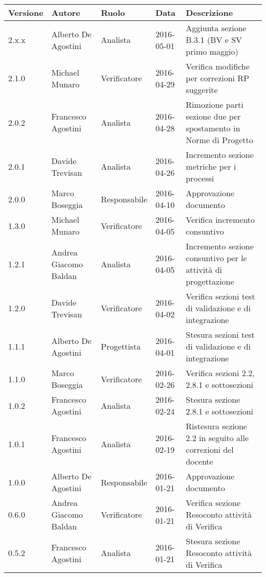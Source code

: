\documentclass{scalatekids-article}
\begin{document}
\begin{center}
  \begin{longtable}{| l | l | l | l | p{5cm} |}
    \hline
    Versione & Autore & Ruolo & Data & Descrizione \\
    \hline
    2.x.x & Alberto De Agostini & Analista & 2016-05-01 & Aggiunta sezione B.3.1 (BV e SV primo maggio) \\ %
    \hline
    2.1.0 & Michael Munaro & Verificatore & 2016-04-29 & Verifica modifiche per correzioni RP suggerite \\
    \hline
    2.0.2 & Francesco Agostini & Analista & 2016-04-28 & Rimozione parti sezione due per spostamento in Norme di Progetto\\
    \hline
    2.0.1 & Davide Trevisan & Analista & 2016-04-26 & Incremento sezione metriche per i processi \\
    \hline
    2.0.0 & Marco Boseggia & Responsabile & 2016-04-10 & Approvazione documento\\
    \hline
    1.3.0 & Michael Munaro & Verificatore & 2016-04-05 & Verifica incremento consuntivo\\
    \hline
    1.2.1 & Andrea Giacomo Baldan & Analista & 2016-04-05 & Incremento sezione consuntivo per le attività di progettazione\\
    \hline
    1.2.0 & Davide Trevisan & Verificatore & 2016-04-02 & Verifica sezioni test di validazione e di integrazione\\
    \hline
    1.1.1 & Alberto De Agostini & Progettista & 2016-04-01 & Stesura sezioni test di validazione e di integrazione\\
    \hline
    1.1.0 & Marco Boseggia & Verificatore & 2016-02-26 & Verifica sezioni 2.2, 2.8.1 e sottosezioni\\
    \hline
    1.0.2 & Francesco Agostini & Analista & 2016-02-24 & Stesura sezione 2.8.1 e sottosezioni\\
    \hline
    1.0.1 & Francesco Agostini & Analista & 2016-02-19 & Ristesura sezione 2.2 in seguito alle correzioni del docente\\
    \hline
    1.0.0 & Alberto De Agostini & Responsabile & 2016-01-21 & Approvazione documento\\
    \hline
    0.6.0 & Andrea Giacomo Baldan & Verificatore & 2016-01-21 & Verifica sezione Resoconto attività di Verifica\\
    \hline
    0.5.2 & Francesco Agostini & Analista & 2016-01-21 & Stesura sezione Resoconto attività di Verifica\\

\end{longtable}
\end{center}
\end{document}
